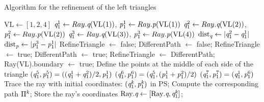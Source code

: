 \begin{algorithm}[h]
\caption{Algorithm for the refinement of the left triangles}\label{alg:left_triangle}
\begin{algorithmic}[1]
\State $\textrm{VL}\gets [1,2,4]$
\State $\textit{q}_1^1\gets Ray.\textit{q}(\textrm{VL}(1))$, $\textit{p}_1^1\gets Ray.\textit{p}(\textrm{VL}(1))$
\State $\textit{q}_1^2\gets Ray.\textit{q}(\textrm{VL}(2))$, $\textit{p}_1^2\gets Ray.\textit{p}(\textrm{VL}(2))$
\State $\textit{q}_1^3\gets Ray.\textit{q}(\textrm{VL}(3))$, $\textit{p}_1^3\gets Ray.\textit{p}(\textrm{VL}(4))$
\State $\textrm{dist}_{\textit{q}}\gets \mbox{$|\textit{q}_1^2-\textit{q}_1^1|$}$
\State $\textrm{dist}_{\textit{p}}\gets \mbox{$|\textit{p}_1^{3}-\textit{p}_1^1|$}$
\State RefineTriangle $\gets$  false;
\State DifferentPath $\gets$  false;
\State RefineTriangle $\gets$  true;
\EndIf
{}
\State DifferentPath $\gets$  true;
\EndIf
\EndFor
{}
\State RefineTriangle $\gets$  DifferentPath;
\Else
{}
\State Ray(\textrm{VL}).boundary $\gets$ true; 
\EndIf
\EndIf
{}
\State Define the points at the middle of each side of the triangle
\State $(\textit{q}_1^5, \textit{p}_1^5) = ((\textit{q}_1^1+\textit{q}_1^2)/2, \textit{p}_1^1)$
\State $(\textit{q}_1^6, \textit{p}_1^6) = (\textit{q}_1^5, (\textit{p}_1^1+\textit{p}_1^2)/2)$
\State $(\textit{q}_1^7, \textit{p}_1^7) = (\textit{q}_1^1, \textit{p}_1^6)$
\State Trace the ray with initial coordinates: $(\textit{q}_1^{\textit{k}}, \textit{p}_1^{\textit{k}})$ in PS;
\State Compute the corresponding path $\Pi^{\textit{k}}$;
\State Store the ray's coordinates $\mbox{Ray}.\textit{q}\gets [\mbox{Ray}.\textit{q}, \textit{q}_1^{\textit{k}}]$;

\end{algorithmic}
\end{algorithm}
